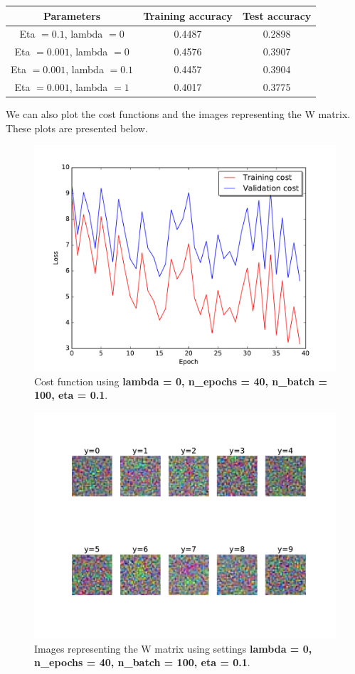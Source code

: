 \documentclass{article}
\begin{document}
\begin{center}
\begin{tabular}{ |c|c|c| } 
\hline
Parameters  &  Training accuracy & Test accuracy  \\
\hline
 Eta $= 0.1$, lambda $= 0$ & 0.4487 & 0.2898 \\
\hline
Eta $= 0.001$, lambda $= 0$  & 0.4576 &  0.3907 \\ 
\hline
Eta $= 0.001$, lambda $= 0.1$   & 0.4457 &  0.3904  \\ 
\hline
Eta $= 0.001$, lambda $= 1$  & 0.4017  &  0.3775  \\ 
\hline 
\end{tabular}
\end{center}

We can also plot the cost functions and the images representing the W matrix. These plots are presented below. 

\begin{figure}[H]
\centering
  \includegraphics[width = 12cm]{../Result_pics/firstCost2.pdf}
\caption{Cost function using \textbf{lambda = 0, n\_epochs = 40, n\_batch = 100, eta = 0.1}. }
\label{fig:firstCost}
\end{figure}

\begin{figure}[H]
\centering
  \includegraphics[width = 12cm]{../Result_pics/firstW2.pdf}
\caption{Images representing the W matrix using settings \textbf{lambda = 0, n\_epochs = 40, n\_batch = 100, eta = 0.1}.}
\label{fig:firstW}
\end{figure}
\end{document}
